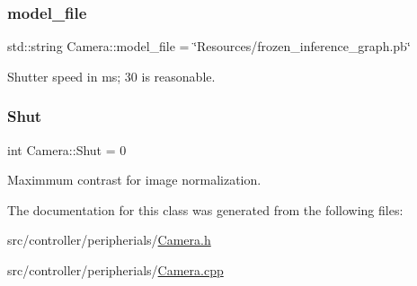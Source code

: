 \mbox{\label{classCamera_a22a0754fc359b253e203ce59026021a0}} 
\subsubsection{\texorpdfstring{model\+\_\+file}{model\_file}}
{\footnotesize\ttfamily std\+::string Camera\+::model\+\_\+file = \char`\"{}Resources/frozen\+\_\+inference\+\_\+graph.\+pb\char`\"{}\hspace{0.3cm}{\ttfamily [private]}}



Shutter speed in ms; 30 is reasonable. 

\mbox{\label{classCamera_ad3d6176cdcccecd116f2e7867b642ad1}} 
\subsubsection{\texorpdfstring{Shut}{Shut}}
{\footnotesize\ttfamily int Camera\+::\+Shut = 0\hspace{0.3cm}{\ttfamily [private]}}



Maximmum contrast for image normalization. 



The documentation for this class was generated from the following files\+:\begin{DoxyCompactItemize}
\item 
src/controller/peripherials/\hyperlink{Camera_8h}{Camera.\+h}\item 
src/controller/peripherials/\hyperlink{Camera_8cpp}{Camera.\+cpp}\end{DoxyCompactItemize}
